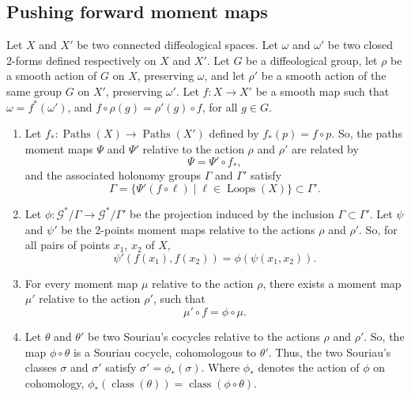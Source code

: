 \documentclass[10pt,reqno,twoside]{amsart}
\newcommand{\cG}{\mathcal{G}}
\DeclareMathOperator{\Paths}{Paths}
\DeclareMathOperator{\Loops}{Loops}
\DeclareMathOperator{\class}{class}
\theoremstyle{plain}
\theoremstyle{definition}
\newcommand{\article}[1]{\subsection{#1}}
\begin{document}
  
  \article{Pushing forward moment maps}
  \label{Pushing-forward- moment-maps}
  Let $X$ and $X'$ be two connected diffeological spaces.
  Let $\omega$ and $\omega'$ be two closed 2-forms defined respectively on $X$ and $X'$.
  Let $G$ be a diffeological group,
  let $\rho$ be a smooth action of $G$ on $X$,
  preserving $\omega$,
  and let $\rho'$ be a smooth action of the same group $G$ on $X'$,
  preserving $\omega'$.
  Let $f: X \to X'$ be a smooth map such that $\omega = f^*(\omega')$,
  and $f \circ \rho(g) = \rho'(g) \circ f$,
  for all $g \in G$.
  \begin{enumerate}
    \item Let $f_* : \Paths(X) \to \Paths(X')$ defined by $f_*(p) = f \circ p$. So, the paths moment maps $\Psi$ and $\Psi'$ relative to the action $\rho$ and $\rho'$ are related by
    $$
      \Psi = \Psi' \circ f_*,
      $$
    and the associated holonomy groups $\Gamma$ and $\Gamma'$ satisfy
    $$
      \Gamma = \{ \Psi'(f \circ \ell) \mid \ell \in \Loops(X) \} \subset\Gamma'.
      $$
    \item Let $\phi: \cG^*\!/\Gamma \to \cG^*\!/\Gamma'$ be the projection induced by the inclusion $\Gamma \subset\Gamma'$. Let $\psi$ and $\psi'$ be the 2-points moment maps relative to the actions $\rho$ and $\rho'$. So, for all pairs of points $x_1$, $x_2$ of $X$,
    $$ \psi'(f(x_1),f(x_2)) = \phi(\psi(x_1,x_2)).
      $$
    \item For every moment map $\mu$ relative to the action $\rho$, there exists a moment map $\mu'$ relative to the action $\rho'$, such that
    $$
      \mu' \circ f = \phi \circ \mu.
      $$
    \item Let $\theta$ and $\theta'$ be two Souriau's cocycles relative to the actions $\rho$ and $\rho'$. So, the map $\phi \circ \theta$ is a Souriau cocycle, cohomologous to $\theta'$. Thus, the two Souriau's classes $\sigma$ and $\sigma'$ satisfy $\sigma' = \phi_*(\sigma)$. Where $\phi_*$ denotes the action of $\phi$ on cohomology, $\phi_*(\class(\theta)) = \class(\phi \circ \theta)$.
  \end{enumerate}
  
\end{document}
